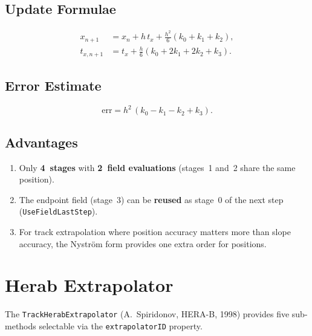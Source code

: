 \documentclass[11pt,a4paper]{article}
\begin{document}
\subsection{Update Formulae}

\begin{align}
  x_{n+1} &= x_n + h\,t_x + \frac{h^2}{6}(k_0 + k_1 + k_2), \\[4pt]
  t_{x,n+1} &= t_x + \frac{h}{6}(k_0 + 2k_1 + 2k_2 + k_3).
\end{align}

\subsection{Error Estimate}

\begin{equation}
  \text{err} = h^2\,(k_0 - k_1 - k_2 + k_3).
\end{equation}

\subsection{Advantages}

\begin{enumerate}[nosep]
  \item Only \textbf{4~stages} with \textbf{2~field evaluations}
        (stages~1 and~2 share the same position).
  \item The endpoint field (stage~3) can be \textbf{reused} as stage~0
        of the next step (\texttt{UseFieldLastStep}).
  \item For track extrapolation where position accuracy matters more than
        slope accuracy, the Nystr\"om form provides one extra order for
        positions.
\end{enumerate}


\section{Herab Extrapolator}\label{sec:herab}

The \texttt{TrackHerabExtrapolator} (A.~Spiridonov, HERA-B, 1998) provides
five sub-methods selectable via the \texttt{extrapolatorID} property.
\end{document}
